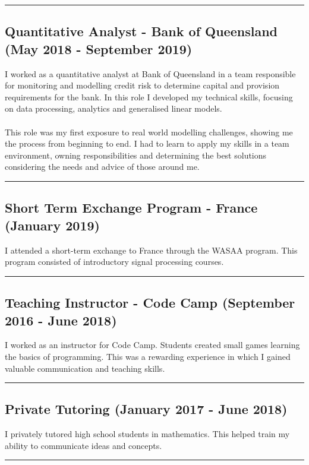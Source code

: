 \noindent\rule{\textwidth}{0.5pt}

\subsection*{Quantitative Analyst - Bank of Queensland (May 2018 - September 2019)}
I worked as a quantitative analyst at Bank of Queensland in a team responsible for monitoring and modelling credit risk to determine capital and provision requirements for the bank. In this role I developed my technical skills, focusing on data processing, analytics and generalised linear models.\\
\\
This role was my first exposure to real world modelling challenges, showing me the process from beginning to end. I had to learn to apply my skills in a team environment, owning responsibilities and determining the best solutions considering the needs and advice of those around me. 

\noindent\rule{\textwidth}{0.5pt}

\subsection*{Short Term Exchange Program - France (January 2019)}

I attended a short-term exchange to France through the WASAA program. This program consisted of introductory signal processing courses.  

\noindent\rule{\textwidth}{0.5pt}

\subsection*{Teaching Instructor - Code Camp (September 2016 - June 2018)}
I worked as an instructor for Code Camp. Students created small games learning the basics of programming. This was a rewarding experience in which I gained valuable communication and teaching skills. 

\noindent\rule{\textwidth}{0.5pt}

\subsection*{Private Tutoring (January 2017 - June 2018)}
I privately tutored high school students in mathematics. This helped train my ability to communicate ideas and concepts.

\noindent\rule{\textwidth}{0.5pt}

